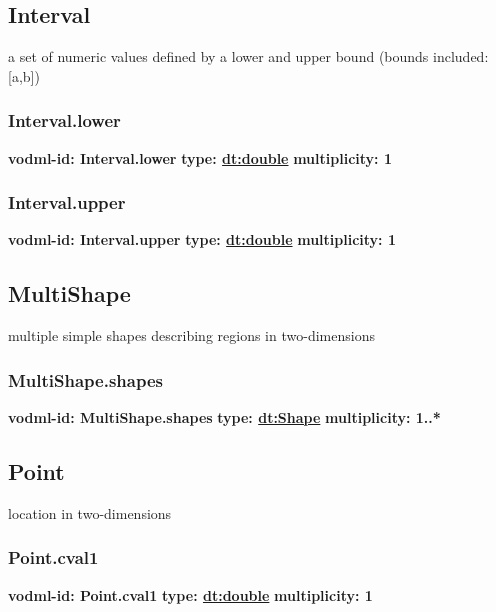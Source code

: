   \subsection{Interval}
  \label{sect:Interval}
    a set of numeric values defined by a lower and upper bound (bounds included: [a,b])

    \subsubsection{Interval.lower}
      \textbf{vodml-id: Interval.lower} \newline
      \textbf{type: \hyperref[sect:double]{dt:double}} \newline
      \textbf{multiplicity: 1} 

    \subsubsection{Interval.upper}
      \textbf{vodml-id: Interval.upper} \newline
      \textbf{type: \hyperref[sect:double]{dt:double}} \newline
      \textbf{multiplicity: 1} 

  \subsection{MultiShape}
  \label{sect:MultiShape}
    multiple simple shapes describing regions in two-dimensions

    \subsubsection{MultiShape.shapes}
      \textbf{vodml-id: MultiShape.shapes} \newline
      \textbf{type: \hyperref[sect:Shape]{dt:Shape}} \newline
      \textbf{multiplicity: 1..*} 

  \subsection{Point}
  \label{sect:Point}
    location in two-dimensions

    \subsubsection{Point.cval1}
      \textbf{vodml-id: Point.cval1} \newline
      \textbf{type: \hyperref[sect:double]{dt:double}} \newline
      \textbf{multiplicity: 1} 

